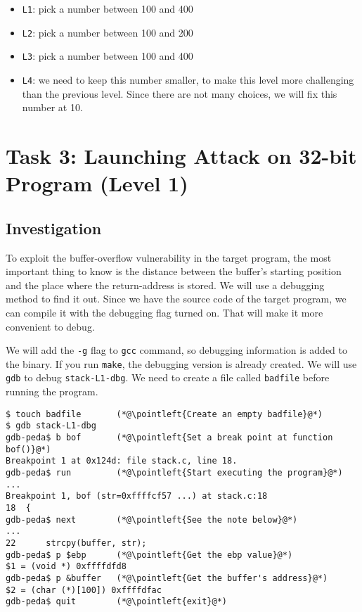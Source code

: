 \begin{itemize}[noitemsep]
\item \texttt{L1}: pick a number between 100 and 400 
\item \texttt{L2}: pick a number between 100 and 200 
\item \texttt{L3}: pick a number between 100 and 400 
\item \texttt{L4}: we need to keep this number smaller, 
to make this level more challenging than the previous level.
Since there are not many choices, we will fix this number at 10.
\end{itemize}
 




\section{Task 3: Launching Attack on 32-bit Program (Level 1)}

\subsection{Investigation} 

To exploit the buffer-overflow vulnerability in the target program,
the most important thing to know is the distance between the 
buffer's starting position and the place where the return-address
is stored. We will use a debugging method to find it out.
Since we have the source code of the target program, we
can compile it with the debugging flag turned on. That will make it more
convenient to debug. 

We will add the \texttt{-g} flag to \texttt{gcc} command, so debugging information
is added to the binary. If you run \texttt{make}, the debugging version
is already created. We will use \texttt{gdb} to debug \texttt{stack-L1-dbg}.  
We need to create a file called
\texttt{badfile} before running the program. 



\begin{lstlisting}
$ touch badfile       (*@\pointleft{Create an empty badfile}@*)
$ gdb stack-L1-dbg
gdb-peda$ b bof       (*@\pointleft{Set a break point at function bof()}@*)
Breakpoint 1 at 0x124d: file stack.c, line 18.
gdb-peda$ run         (*@\pointleft{Start executing the program}@*)
...
Breakpoint 1, bof (str=0xffffcf57 ...) at stack.c:18
18  {
gdb-peda$ next        (*@\pointleft{See the note below}@*)
...
22	    strcpy(buffer, str);
gdb-peda$ p $ebp      (*@\pointleft{Get the ebp value}@*)
$1 = (void *) 0xffffdfd8   
gdb-peda$ p &buffer   (*@\pointleft{Get the buffer's address}@*)
$2 = (char (*)[100]) 0xffffdfac
gdb-peda$ quit        (*@\pointleft{exit}@*)
\end{lstlisting}

